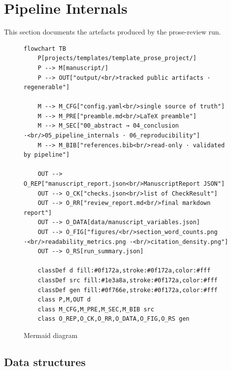 \documentclass[
]{article}
\begin{document}
\newpage

\section{Pipeline Internals}\label{sec:pipeline_internals}

This section documents the artefacts produced by the prose-review run.

\begin{figure}[htbp]
\centering
\begin{verbatim}
flowchart TB
    P[projects/templates/template_prose_project/]
    P --> M[manuscript/]
    P --> OUT["output/<br/>tracked public artifacts · regenerable"]

    M --> M_CFG["config.yaml<br/>single source of truth"]
    M --> M_PRE["preamble.md<br/>LaTeX preamble"]
    M --> M_SEC["00_abstract → 04_conclusion ·<br/>05_pipeline_internals · 06_reproducibility"]
    M --> M_BIB["references.bib<br/>read-only · validated by pipeline"]

    OUT --> O_REP["manuscript_report.json<br/>ManuscriptReport JSON"]
    OUT --> O_CK["checks.json<br/>list of CheckResult"]
    OUT --> O_RR["review_report.md<br/>final markdown report"]
    OUT --> O_DATA[data/manuscript_variables.json]
    OUT --> O_FIG["figures/<br/>section_word_counts.png ·<br/>readability_metrics.png ·<br/>citation_density.png"]
    OUT --> O_RS[run_summary.json]

    classDef d fill:#0f172a,stroke:#0f172a,color:#fff
    classDef src fill:#1e3a8a,stroke:#0f172a,color:#fff
    classDef gen fill:#0f766e,stroke:#0f172a,color:#fff
    class P,M,OUT d
    class M_CFG,M_PRE,M_SEC,M_BIB src
    class O_REP,O_CK,O_RR,O_DATA,O_FIG,O_RS gen
\end{verbatim}
\caption{Mermaid diagram}
\end{figure}

\subsection{Data structures}\label{data-structures}
\end{document}
